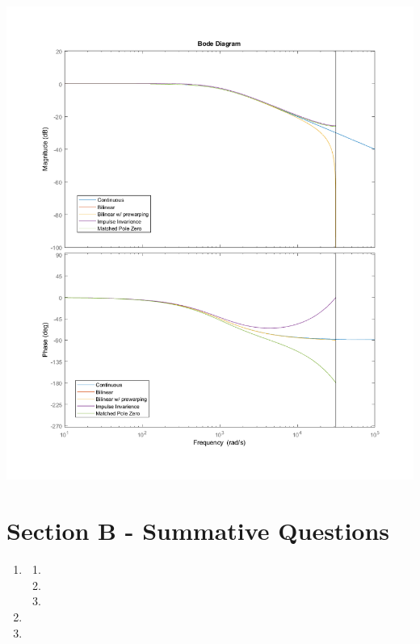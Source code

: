 \documentclass[11pt]{article}
\begin{document}
\begin{preview}
\begin{enumerate}
\begin{center}
        \includegraphics[height=0.3\textwidth]{fig/3_bode.png}
    \end{center}
\end{enumerate}

\section*{Section B - Summative Questions}
\begin{enumerate}
    \item 
    \begin{enumerate}
        \item 
        \item 
        \item 
    \end{enumerate}
    \item 
    \item 
\end{enumerate}
\end{preview}
\end{document}
